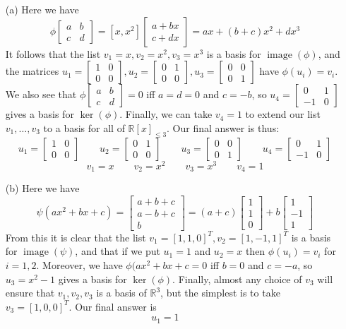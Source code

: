 \documentclass{amsart}
\newcommand{\R}         {{\mathbb{R}}}
\newcommand{\img}       {\operatorname{image}}
\newcommand{\bsm}       {\left[\begin{smallmatrix}}
\newcommand{\esm}       {\end{smallmatrix}\right]}
\renewcommand{\:}       {\colon}
\theoremstyle{definition}
\renewenvironment{solution}{\SolutionAtEnd}{\endSolutionAtEnd}
\begin{document}
\begin{solution}
 \begin{itemize}
  \item[(a)] Here we have
   \[ \phi\bsm a&b\\ c&d\esm = 
       [x,x^2]\bsm a+bx\\ c+dx\esm = ax+(b+c)x^2+dx^3
   \]
   It follows that the list $v_1=x,v_2=x^2,v_3=x^3$ is a
   basis for $\img(\phi)$, and the matrices
   $u_1=\bsm 1&0\\0&0\esm,u_2=\bsm 0&1\\0&0\esm,u_3=\bsm 0&0\\0&1\esm$
   have $\phi(u_i)=v_i$.  We also see that $\phi\bsm a&b\\ c&d\esm=0$ 
   iff $a=d=0$ and $c=-b$, so $u_4=\bsm 0&1\\-1&0\esm$ gives
   a basis for $\ker(\phi)$.  Finally, we can take $v_4=1$
   to extend our list $v_1,\dotsc,v_3$ to a basis for all of
   $\R[x]_{\leq 3}$.  Our final answer is thus:
   \[ u_1=\bsm 1&0\\0&0\esm\hspace{2em}
      u_2=\bsm 0&1\\0&0\esm\hspace{2em}
      u_3=\bsm 0&0\\0&1\esm\hspace{2em}
      u_4=\bsm 0&1\\-1&0\esm
   \]
   \[ v_1=x\hspace{2em} 
      v_2=x^2\hspace{2em}
      v_3=x^3\hspace{2em}
      v_4=1
   \]
  \item[(b)] Here we have
   \[ \psi(ax^2+bx+c) =
       \bsm a+b+c \\ a-b+c\\ b \esm = 
       (a+c)\bsm 1\\1\\0 \esm + b \bsm 1\\-1\\1\esm
   \]
   From this it is clear that the list
   $v_1=[1,1,0]^T,v_2=[1,-1,1]^T$ is a basis for
   $\img(\psi)$, and that if we put $u_1=1$ and $u_2=x$ then
   $\phi(u_i)=v_i$ for $i=1,2$.  Moreover, we have
   $\phi(ax^2+bx+c=0$ iff $b=0$ and $c=-a$, so $u_3=x^2-1$
   gives a basis for $\ker(\phi)$.  Finally, almost any
   choice of $v_3$ will ensure that $v_1,v_2,v_3$ is a basis
   of $\R^3$, but the simplest is to take $v_3=[1,0,0]^T$.
   Our final answer is
   \[ u_1 = 1\hspace{2em} 
\]
\end{itemize}
\end{solution}
\end{document}
